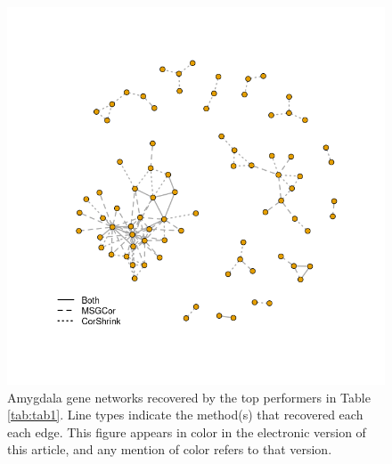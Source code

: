 \documentclass[useAMS,referee,usenatbib]{biom}
\begin{document}
\begin{figure}
  \begin{center}
    \includegraphics[width=0.45\textheight]{img/networks_A_2.png}
  \end{center}
\caption{Amygdala gene networks recovered by the top performers in Table \ref{tab:tab1}. Line types indicate the method(s) that recovered each each edge. This figure appears in color in the electronic version of this article, and any mention of color refers to that version.}
\label{network_A}
\end{figure}
\end{document}
